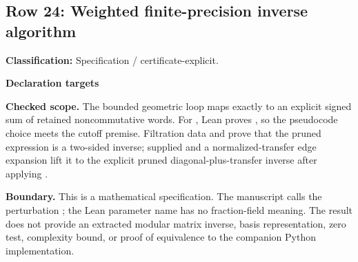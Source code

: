 \subsection{Row 24: Weighted finite-precision inverse algorithm}
\label{row:24}
\textbf{Classification:} Specification / certificate-explicit.
\par\smallskip\textbf{Declaration targets}\par
{\small\noindent{}\par}
{\small\noindent{}\par}
{\small\noindent{}\par}
{\small\noindent{}\par}
{\small\noindent{}\par}
{\small\noindent{}\par}
{\small\noindent{}\par}
{\small\noindent{}\par}
\smallskip\textbf{Checked scope.} The bounded geometric loop maps exactly to an explicit signed sum of retained noncommutative words. For , Lean proves , so the pseudocode choice  meets the cutoff premise. Filtration data and  prove that the pruned expression is a two-sided inverse; supplied  and a normalized-transfer edge expansion lift it to the explicit pruned diagonal-plus-transfer inverse after applying .
\par\smallskip\textbf{Boundary.} This is a mathematical specification. The manuscript calls the perturbation ; the Lean parameter name  has no fraction-field meaning. The result does not provide an extracted modular matrix inverse, basis representation, zero test, complexity bound, or proof of equivalence to the companion Python implementation.
\medskip
{}
